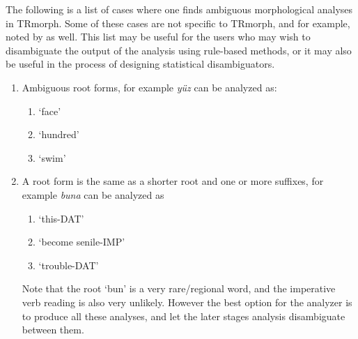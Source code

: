\documentclass[twocolumn]{article}
\begin{document}
The following is a list of cases where one finds ambiguous
morphological analyses in TRmorph. Some of these cases are not
specific to TRmorph, and for example, noted by \textcite{oflazer1997} as
well. This list may be useful for the users who may wish to
disambiguate the output of the analysis using rule-based methods, or
it may also be useful in the process of designing statistical
disambiguators.

\begin{enumerate}
\item Ambiguous root forms, for example \emph{yüz} can be analyzed as:
    \begin{enumerate}
        \item {} `face'
        \item {} `hundred'
        \item {} `swim'
    \end{enumerate}
\item\label{itm:buna} A root form is the same as a shorter root and one or more
suffixes, for example \emph{buna} can be analyzed as
    \begin{enumerate}
        \item {} `this-DAT'
        \item {} `become senile-IMP'
        \item {}   `trouble-DAT'
    \end{enumerate}
Note that the root `bun' is a very rare/regional word, and the imperative
verb reading is also very unlikely. However the best option
for the analyzer is to produce all these analyses, and let the later
stages analysis disambiguate between them.


\end{enumerate}
\end{document}
